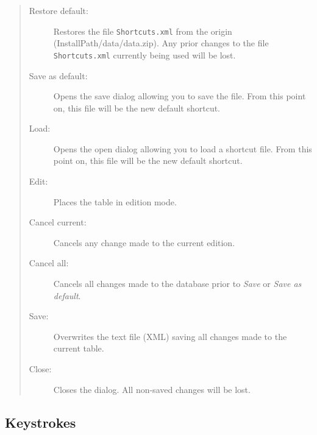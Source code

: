 \begin{quote}
  \begin{footnotesize}
    \begin{description}
      \item[Restore default:]
        Restores the file \texttt{Shortcuts.xml} from the origin
        (InstallPath/data/data.zip). Any prior changes to the file
        \texttt{Shortcuts.xml} currently being used will be lost.
      \item[Save as default:]
        Opens the save dialog allowing you to save the file. From
        this point on, this file will be the new default shortcut.
      \item[Load:]
        Opens the open dialog allowing you to load a shortcut file.
        From this point on, this file will be the new default shortcut.
      \item[Edit:]
        Places the table in edition mode.
      \item[Cancel current:]
        Cancels any change made to the current edition.
      \item[Cancel all:]
        Cancels all changes made to the database prior to \textit{Save} or \textit{Save as default}.
      \item[Save:]
        Overwrites the text file (XML) saving all changes made to the current table.
      \item[Close:]
        Closes the dialog. All non-saved changes will be lost.
    \end{description}
  \end{footnotesize}
\end{quote}

\subsection{Keystrokes}

